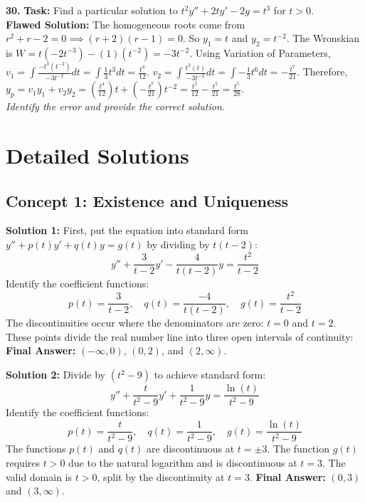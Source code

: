 \documentclass[11pt]{article}
\begin{document}
\textbf{30.} \textbf{Task:} Find a particular solution to $t^2 y'' + 2ty' - 2y = t^3$ for $t > 0$. \\
\textbf{Flawed Solution:} The homogeneous roots come from $r^2 + r - 2 = 0 \implies (r+2)(r-1)=0$. So $y_1 = t$ and $y_2 = t^{-2}$. The Wronskian is $W = t(-2t^{-3}) - (1)(t^{-2}) = -3t^{-2}$. Using Variation of Parameters, $v_1 = \int \frac{-t^3(t^{-2})}{-3t^{-2}} dt = \int \frac{1}{3} t^3 dt = \frac{t^4}{12}$. $v_2 = \int \frac{t^3(t)}{-3t^{-2}} dt = \int -\frac{1}{3} t^6 dt = -\frac{t^7}{21}$. Therefore, $y_p = v_1 y_1 + v_2 y_2 = \left(\frac{t^4}{12}\right)t + \left(-\frac{t^7}{21}\right)t^{-2} = \frac{t^5}{12} - \frac{t^5}{21} = \frac{t^5}{28}$. \\
\textit{Identify the error and provide the correct solution.}

\newpage

\section{Detailed Solutions}

\subsection*{Concept 1: Existence and Uniqueness}

\textbf{Solution 1:}
First, put the equation into standard form $y'' + p(t)y' + q(t)y = g(t)$ by dividing by $t(t - 2)$:
\[ y'' + \frac{3}{t - 2}y' - \frac{4}{t(t - 2)}y = \frac{t^2}{t - 2} \]
Identify the coefficient functions:
\[ p(t) = \frac{3}{t - 2}, \quad q(t) = \frac{-4}{t(t - 2)}, \quad g(t) = \frac{t^2}{t - 2} \]
The discontinuities occur where the denominators are zero: $t = 0$ and $t = 2$. These points divide the real number line into three open intervals of continuity:
\textbf{Final Answer:} $(-\infty, 0)$, $(0, 2)$, and $(2, \infty)$.

\textbf{Solution 2:}
Divide by $(t^2 - 9)$ to achieve standard form:
\[ y'' + \frac{t}{t^2 - 9}y' + \frac{1}{t^2 - 9}y = \frac{\ln(t)}{t^2 - 9} \]
Identify the coefficient functions:
\[ p(t) = \frac{t}{t^2 - 9}, \quad q(t) = \frac{1}{t^2 - 9}, \quad g(t) = \frac{\ln(t)}{t^2 - 9} \]
The functions $p(t)$ and $q(t)$ are discontinuous at $t = \pm 3$. The function $g(t)$ requires $t > 0$ due to the natural logarithm and is discontinuous at $t = 3$. The valid domain is $t > 0$, split by the discontinuity at $t = 3$.
\textbf{Final Answer:} $(0, 3)$ and $(3, \infty)$.
\end{document}
